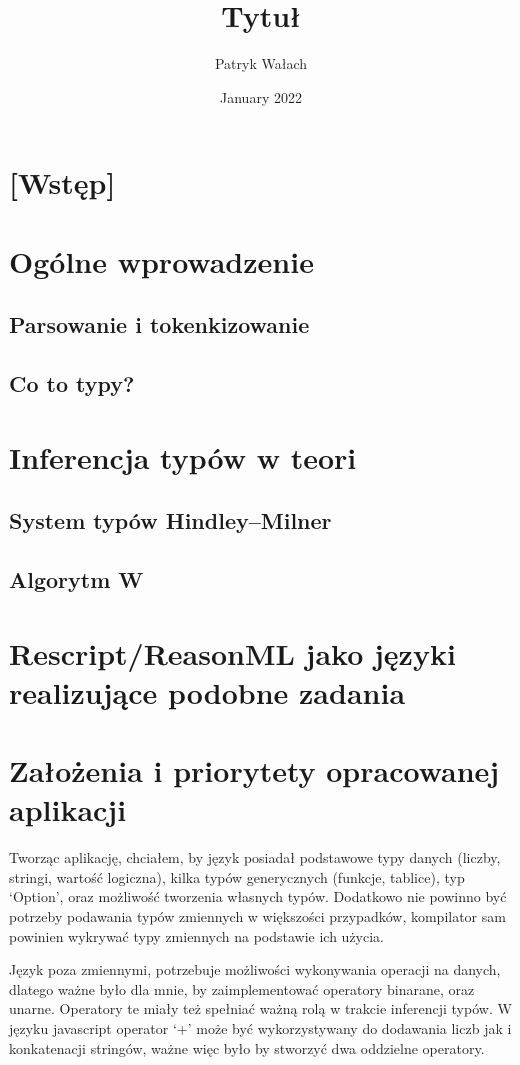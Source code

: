 \documentclass{article}
\title{Tytuł}
\author{Patryk Wałach}
\date{January 2022}
\begin{document}
\maketitle

\section{[Wstęp]}

\section{Ogólne wprowadzenie}
\subsection{Parsowanie i tokenkizowanie}
\subsection{Co to typy?}
\section{Inferencja typów w teori}
\subsection{System typów Hindley–Milner}
\subsection{Algorytm W}
\section{Rescript/ReasonML jako języki realizujące podobne zadania}
\newpage
\section{Założenia i priorytety opracowanej aplikacji}
Tworząc aplikację, chciałem, by język posiadał podstawowe typy danych (liczby, stringi, wartość logiczna), kilka typów generycznych (funkcje, tablice), typ `Option', oraz możliwość tworzenia własnych typów.
Dodatkowo nie powinno być potrzeby podawania typów zmiennych w większości przypadków, kompilator sam powinien wykrywać typy zmiennych na podstawie ich użycia.


Język poza zmiennymi, potrzebuje możliwości wykonywania operacji na danych, dlatego ważne było dla mnie, by zaimplementować operatory binarane, oraz unarne. Operatory te miały też spełniać ważną rolą w trakcie inferencji typów. W języku javascript operator `+' może być wykorzystywany do dodawania liczb jak i konkatenacji stringów, ważne więc było by stworzyć dwa oddzielne operatory.
\end{document}
